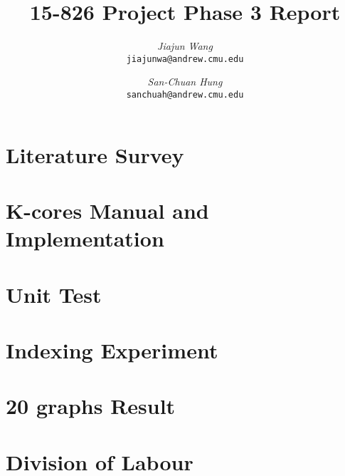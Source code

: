 \documentclass[12pt]{article}
\begin{document}
\renewcommand{\algorithmicrequire}{\textbf{Input:}}  %
\renewcommand{\algorithmicensure}{\textbf{Output:}} %
 
\newcommand{\beq}{\begin{equation}}
\newcommand{\eeq}{\end{equation}}
\newcommand{\bit}{\begin{itemize*}}
\newcommand{\eit}{\end{itemize*}}
\newcommand{\goal}[1]{ {\noindent {$\Rightarrow$} \em {#1} } }
\newcommand{\hide}[1]{}
\newcommand{\comment}[1]{ {\footnotesize {#1} } }
\newtheorem{lemma}{Lemma}
\newtheorem{theorem}{Theorem}
\newtheorem{proof}{Proof}
\newtheorem{defn}{Definition}
\newtheorem{algo}{Algorithm}
\newtheorem{observation}{Observation}

\title{15-826 Project Phase 3 Report}

\author{ {\em Jiajun Wang} \\
	    {\tt jiajunwa@andrew.cmu.edu}
	 \and
	 {\em San-Chuan Hung} \\
	     {\tt sanchuah@andrew.cmu.edu}
}

\maketitle

\section{Literature Survey}
    \label{sec:survey}
    

\section{K-cores Manual and Implementation}
    \label{sec:kcor}
    

\section{Unit Test}
    \label{sec:unittest}
    

\section{Indexing Experiment}
	\label{sec:indexing}
	
	
\section{20 graphs Result}
	\label{sec:experiment}
    
	
\section{Division of Labour}
	\label{sec:dl}
    
	


\end{document}
